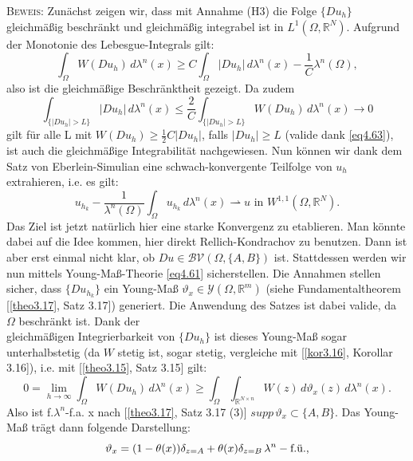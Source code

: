 \textsc{Beweis:} Zunächst zeigen wir, dass mit Annahme (H3) die Folge \(\{Du_h\}\) gleichmäßig beschränkt und gleichmäßig integrabel ist in \(L^1(\Omega,\mathbb{R}^N)\). Aufgrund der Monotonie des Lebesgue-Integrals gilt:
\begin{equation}
    \int_{\Omega} W(Du_h)\,d\lambda^n(x) \geq C\int_{\Omega} |Du_h| \,d\lambda^n(x) - \frac{1}{C}\lambda^n(\Omega),
\end{equation}
also ist die gleichmäßige Beschränktheit gezeigt. Da zudem
\begin{equation}
    \int_{\{|Du_h| > L\}} |Du_h| \,d\lambda^n(x) \leq \frac{2}{C}\int_{\{|Du_h| > L\}} W(Du_h) \,d\lambda^n(x) \to 0
\end{equation}
gilt für alle L mit \(W(Du_h) \geq \frac{1}{2}C|Du_h|\), falls \(|Du_h| \geq L\) (valide dank \eqref{eq4.63}), ist auch die gleichmäßige Integrabilität nachgewiesen. Nun können wir dank dem Satz von Eberlein-Simulian eine schwach-konvergente Teilfolge von \(u_h\) extrahieren, i.e. es gilt:
\begin{equation}
    u_{h_k} - \frac{1}{\lambda^n(\Omega)} \int_{\Omega}u_{h_k} \,d\lambda^n(x) \rightharpoonup u \text{ in }W^{1,1}(\Omega,\mathbb{R}^N).
\end{equation}
Das Ziel ist jetzt natürlich hier eine starke Konvergenz zu etablieren. Man könnte dabei auf die Idee kommen, hier direkt Rellich-Kondrachov zu benutzen. Dann ist aber erst einmal nicht klar, ob \(Du \in \mathcal{BV}(\Omega,\{A,B\})\) ist. Stattdessen werden wir nun mittels Young-Maß-Theorie \eqref{eq4.61} sicherstellen. Die Annahmen stellen sicher, dass \(\{Du_{h_k}\}\) ein Young-Maß \(\vartheta_x \in \mathcal{Y}(\Omega,\mathbb{R}^m)\) (siehe Fundamentaltheorem [\ref{theo3.17}, Satz 3.17]) generiert. Die Anwendung des Satzes ist dabei valide, da \(\Omega\) beschränkt ist. Dank der \\gleichmäßigen Integrierbarkeit von \(\{Du_h\}\) ist dieses Young-Maß sogar unterhalbstetig (da \(W\) stetig ist, sogar stetig, vergleiche mit [\ref{kor3.16}, Korollar 3.16]), i.e. mit [\ref{theo3.15}, Satz 3.15] gilt:
\begin{equation}
    0 = \lim_{h \to \infty} \int_{\Omega}W(Du_h) \,d\lambda^n(x) \geq \int_{\Omega} \int_{\mathbb{R}^{N \times n}} W(z) \,d\vartheta_x(z) \,d\lambda^n(x).
\end{equation}
Also ist f.\(\lambda^n\)-f.a. x nach [\ref{theo3.17}, Satz 3.17 (3)] \(supp \, \vartheta_x \subset \{A,B\}\). Das Young-Maß trägt dann folgende Darstellung:
\begin{equation}{\label{eq4.69}}
    \vartheta_x = (1-\theta(x)) \delta_{z=A} + \theta(x) \delta_{z=B} \, \lambda^n-\text{f.ü.},
\end{equation}
